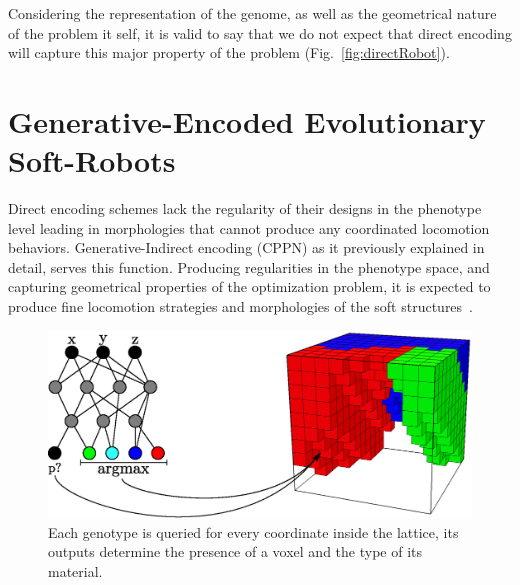 Considering the representation of the genome, as well as the geometrical nature of the problem it self, it is valid to say that we do not expect that direct encoding will capture this major property of the problem (Fig.~\ref{fig:directRobot}).

\section{Generative-Encoded Evolutionary Soft-Robots}

Direct encoding schemes lack the regularity of their designs in the phenotype level leading in morphologies that cannot produce any coordinated locomotion behaviors. Generative-Indirect encoding (CPPN) as it previously explained in detail, serves this function. Producing regularities in the phenotype space, and capturing geometrical properties of the optimization problem, it is expected to produce fine locomotion strategies and morphologies of the soft structures~\cite{cheney2013unshackling}.

\begin{figure}
\centering
\includegraphics[height=0.2\textheight]{../Figures/Misc/cppnSoftBot.eps}
\caption{Each genotype is queried for every coordinate inside the lattice, its outputs determine the presence of a voxel and the type of its material.}
\label{fig:cppnDiagram}
\end{figure}

